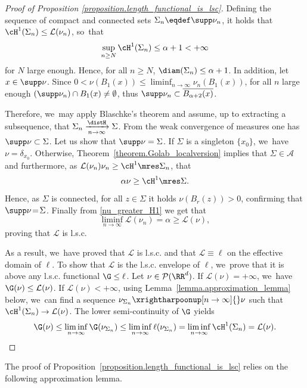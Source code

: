 \begin{proof}[Proof of Proposition \ref{proposition.length_functional_is_lsc}]
Defining the sequence of compact and connected sets $\Sigma_n \eqdef \supp \nu_n$, it holds that $\cH^1(\Sigma_n) \le \mathcal{L}(\nu_n)$, so~that
\[
\sup_{n\geq N} \cH^1(\Sigma_n) \leq \alpha +1 <+\infty
\]
for $N$ large enough. Hence, for all $n\ge N$, $\diam(\Sigma_n)\leq \alpha +1$. In addition, let $x\in \supp \nu$. Since $0<\nu(B_1(x))\leq \liminf_{n\to \infty}\nu_n(B_1(x))$, for all $n$ large enough $\left(\supp \nu_n\right)\cap B_1(x)\neq \emptyset$, thus $\supp \nu_n \subset \overline{B_{\alpha+2}(x)}$.

Therefore, we~may apply Blaschke's theorem and assume,
up to extracting a subsequence, that $\Sigma_n \xrightarrow[n \to \infty]{\distH} \Sigma$. From the weak convergence of measures one has $\supp \nu \subset \Sigma$. Let us show that $\supp \nu = \Sigma$. If $\Sigma$ is a singleton $\{x_0\}$, we~have $\nu = \delta_{x_0}$. Otherwise, Theorem~\ref{theorem.Golab_localversion} implies that $\Sigma \in \mathcal{A}$ and furthermore, as $\mathcal{L}(\nu_n) \nu_n \ge \cH^1\mres \Sigma_n$, that
\begin{equation}
\label{nu_greater_H1}
\alpha \nu \ge \cH^1\mres \Sigma.
\end{equation}
Hence, as $\Sigma$ is connected, for all $z \!\in\! \Sigma$ it holds $\nu(B_r(z)) \!>\! 0$, confirming that $\supp \nu \!=\! \Sigma$. Finally from \eqref{nu_greater_H1} we get that
\[
\liminf_{n \to \infty} \mathcal{L}(\nu_n)
=
\alpha
\ge
\mathcal{L}(\nu),
\]
proving that $\mathcal{L}$ is l.s.c.

As a result, we~have proved that $\mathcal{L}$ is l.s.c. and that $\mathcal{L}\equiv \ell$ on the effective domain of $\ell$. To show that $\mathcal{L}$ is the l.s.c. envelope of $\ell$, we~prove that it is above any l.s.c. functional $\G \le \ell$. Let $\nu \in \mathcal{P}(\RR^d)$. If $\mathcal{L}(\nu)=+\infty$, we~have $\G(\nu)\leq \mathcal{L}(\nu)$. If $\mathcal{L}(\nu)<+\infty$, using Lemma~\ref{lemma.approximation_lemma} below, we~can find a sequence $\nu_{\Sigma_n} \xrightharpoonup[n \to \infty]{} \nu$ such that $\cH^1(\Sigma_n) \rightarrow \mathcal{L}(\nu)$. The lower semi-continuity of $\G$ yields
\begin{equation*}
\G(\nu) \le \liminf_{n \to \infty} \G(\nu_{\Sigma_n })
\le \liminf_{n \to \infty} \ell(\nu_{\Sigma_n })
= \liminf_{n \to \infty} \cH^1(\Sigma_n)
= \mathcal{L}(\nu).\qedhere
\end{equation*}
\end{proof}

The proof of Proposition~\ref{proposition.length_functional_is_lsc} relies on the following approximation lemma.

